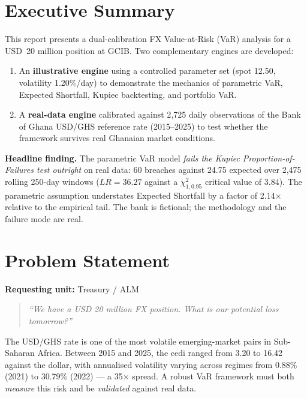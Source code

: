 \documentclass[11pt,a4paper]{article}
\begin{document}
\section{Executive Summary}

This report presents a dual-calibration FX Value-at-Risk (VaR) analysis
for a USD~20 million position at GCIB. Two complementary engines are
developed:

\begin{enumerate}[leftmargin=1.6em]
    \item An \textbf{illustrative engine} using a controlled parameter
          set (spot 12.50, volatility 1.20\%/day) to demonstrate the
          mechanics of parametric VaR, Expected Shortfall, Kupiec
          backtesting, and portfolio VaR.
    \item A \textbf{real-data engine} calibrated against 2{,}725 daily
          observations of the Bank of Ghana USD/GHS reference rate
          (2015--2025) to test whether the framework survives real
          Ghanaian market conditions.
\end{enumerate}

\noindent\textbf{Headline finding.} The parametric VaR model \emph{fails
the Kupiec Proportion-of-Failures test outright} on real data: 60 breaches
against 24.75 expected over 2{,}475 rolling 250-day windows
(\(LR = 36.27\) against a \(\chi^2_{1,0.95}\) critical value of 3.84).
The parametric assumption understates Expected Shortfall by a factor of
2.14\(\times\) relative to the empirical tail. The bank is fictional; the
methodology and the failure mode are real.

\section{Problem Statement}

\noindent\textbf{Requesting unit:} Treasury / ALM

\begin{quote}
\itshape
``We have a USD 20 million FX position. What is our potential loss tomorrow?''
\end{quote}

\noindent The USD/GHS rate is one of the most volatile emerging-market
pairs in Sub-Saharan Africa. Between 2015 and 2025, the cedi ranged from
3.20 to 16.42 against the dollar, with annualised volatility varying
across regimes from 0.88\% (2021) to 30.79\% (2022) --- a 35\(\times\)
spread. A robust VaR framework must both \emph{measure} this risk and be
\emph{validated} against real data.
\end{document}
